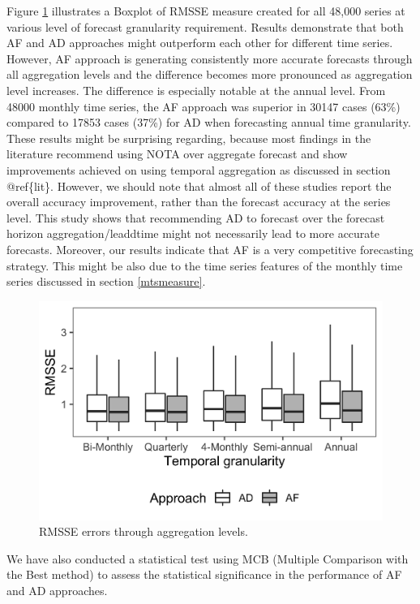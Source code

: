 \documentclass[]{elsarticle} %
\begin{document}
Figure \ref{fig:RMSSE} illustrates a Boxplot of RMSSE measure created
for all 48,000 series at various level of forecast granularity
requirement. Results demonstrate that both AF and AD approaches might
outperform each other for different time series. However, AF approach is
generating consistently more accurate forecasts through all aggregation
levels and the difference becomes more pronounced as aggregation level
increases. The difference is especially notable at the annual level.
From 48000 monthly time series, the AF approach was superior in 30147
cases (63\%) compared to 17853 cases (37\%) for AD when forecasting
annual time granularity. These results might be surprising regarding,
because most findings in the literature recommend using NOTA over
aggregate forecast and show improvements achieved on using temporal
aggregation as discussed in section @ref\{lit\}. However, we should note
that almost all of these studies report the overall accuracy
improvement, rather than the forecast accuracy at the series level. This
study shows that recommending AD to forecast over the forecast horizon
aggregation/leaddtime might not necessarily lead to more accurate
forecasts. Moreover, our results indicate that AF is a very competitive
forecasting strategy. This might be also due to the time series features
of the monthly time series discussed in section \ref{mtsmeasure}.

\begin{figure}[H]

{\centering \includegraphics[width=0.7\linewidth]{img/300dpi/box_plot_rmsse} 

}

\caption{RMSSE errors through aggregation levels.}\label{fig:RMSSE}
\end{figure}

We have also conducted a statistical test using MCB (Multiple Comparison
with the Best method) \citep{MCB} to assess the statistical significance
in the performance of AF and AD approaches.
\end{document}
